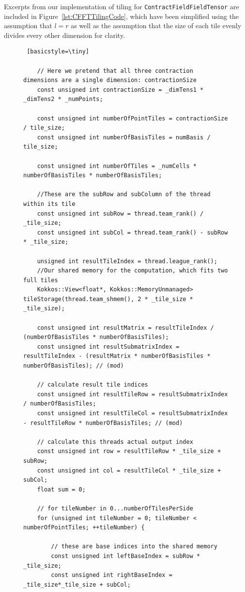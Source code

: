 Excerpts from our implementation of tiling for \texttt{ContractFieldFieldTensor} are included in Figure~\ref{lst:CFFTTilingCode}, which have been simplified using the assumption that $l=r$ as well as the assumption that the size of each tile evenly divides every other dimension for clarity. 

\begin{figure}[H]
    \begin{lstlisting} [basicstyle=\tiny]

    // Here we pretend that all three contraction dimensions are a single dimension: contractionSize
    const unsigned int contractionSize = _dimTens1 * _dimTens2 * _numPoints;
    
    const unsigned int numberOfPointTiles = contractionSize / tile_size;
    const unsigned int numberOfBasisTiles = numBasis / tile_size;

    const unsigned int numberOfTiles = _numCells * numberOfBasisTiles * numberOfBasisTiles;
    
    //These are the subRow and subColumn of the thread within its tile
    const unsigned int subRow = thread.team_rank() / _tile_size;
    const unsigned int subCol = thread.team_rank() - subRow * _tile_size;

    unsigned int resultTileIndex = thread.league_rank();
    //Our shared memory for the computation, which fits two full tiles
    Kokkos::View<float*, Kokkos::MemoryUnmanaged> tileStorage(thread.team_shmem(), 2 * _tile_size * _tile_size);

    const unsigned int resultMatrix = resultTileIndex / (numberOfBasisTiles * numberOfBasisTiles);
    const unsigned int resultSubmatrixIndex = resultTileIndex - (resultMatrix * numberOfBasisTiles * numberOfBasisTiles); // (mod)

    // calculate result tile indices
    const unsigned int resultTileRow = resultSubmatrixIndex / numberOfBasisTiles;
    const unsigned int resultTileCol = resultSubmatrixIndex - resultTileRow * numberOfBasisTiles; // (mod)

    // calculate this threads actual output index
    const unsigned int row = resultTileRow * _tile_size + subRow;
    const unsigned int col = resultTileCol * _tile_size + subCol;
    float sum = 0;

    // for tileNumber in 0...numberOfTilesPerSide
    for (unsigned int tileNumber = 0; tileNumber < numberOfPointTiles; ++tileNumber) {

        // these are base indices into the shared memory
        const unsigned int leftBaseIndex = subRow * _tile_size;
        const unsigned int rightBaseIndex = _tile_size*_tile_size + subCol;


\end{lstlisting}
\end{figure}
